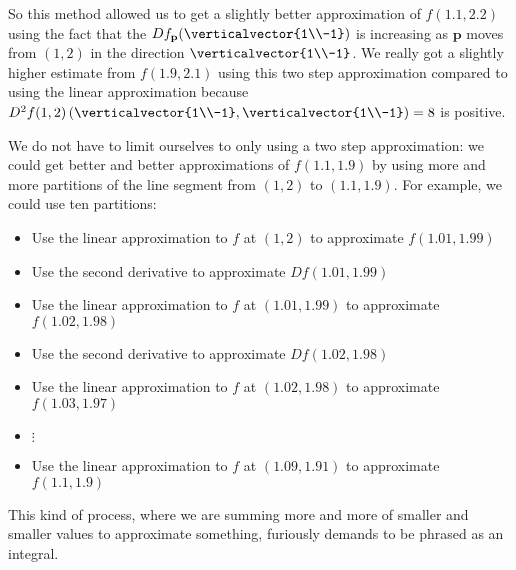 \documentclass{article}
\begin{document}
\begin{question}
		So this method allowed us to get a slightly better approximation of $f(1.1,2.2)$ using the fact that the $Df_{\mathbf{p}}(\verticalvector{1\\-1})$ is increasing
		as $\mathbf{p}$ moves from $(1,2)$ in the direction $\verticalvector{1\\-1}$.  We really got a slightly higher estimate from $f(1.9,2.1)$ using this two step
		approximation compared to using the linear approximation because 
		$D^2f(1,2)\left(\verticalvector{1\\-1},\verticalvector{1\\-1} \right) = 8$ is positive.  
		
		We do not have to limit ourselves to only using a two step approximation:  we could get better and better approximations of $f(1.1,1.9)$
		by using more and more partitions of the line segment from $(1,2)$ to $(1.1,1.9)$.  For example, we could use ten partitions:
		\begin{itemize}
			\item Use the linear approximation to $f$ at $(1,2)$ to approximate $f(1.01,1.99)$
			\item Use the second derivative to approximate $Df(1.01,1.99)$
			\item Use the linear approximation to $f$ at $(1.01,1.99)$ to approximate $f(1.02,1.98)$
			\item Use the second derivative to approximate $Df(1.02,1.98)$
			\item Use the linear approximation to $f$ at $(1.02,1.98)$ to approximate $f(1.03,1.97)$
			\item $\vdots$
			\item  Use the linear approximation to $f$ at $(1.09,1.91)$ to approximate $f(1.1,1.9)$
		\end{itemize}
		
		This kind of process, where we are summing more and more of smaller and smaller values to approximate something, 
		furiously demands to be phrased as an integral.
		

\end{question}
\end{document}
